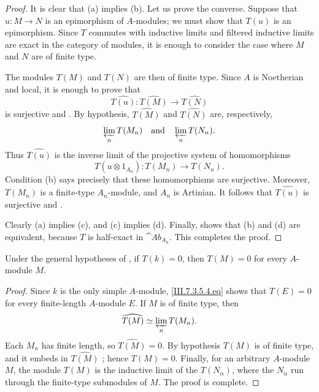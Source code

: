\begin{proof}
It is clear that (a) implies (b).  Let us prove the converse.
Suppose that $u:M\to N$ is an epimorphism of $A$-modules; we
must show that $T(u)$ is an epimorphism.  Since $T$ commutes
with inductive limits and filtered inductive limits are exact
in the category of modules, it is enough to consider the case
where $M$ and $N$ are of finite type.

The modules $T(M)$ and $T(N)$ are then of finite type.  Since
$A$ is Noetherian and local, it is enough to prove that
\[
  \widehat{T(u)}:
  \widehat{T(M)}
  \longrightarrow
  \widehat{T(N)}
\]
is surjective  and .
By hypothesis, $\widehat{T(M)}$ and $\widehat{T(N)}$ are,
respectively,
\[
  \varprojlim_n T(M_n)
  \quad\hbox{and}\quad
  \varprojlim_n T(N_n).
\]
Thus $\widehat{T(u)}$ is the inverse limit of the projective
system of homomorphisms
\[
  T(u\otimes 1_{A_n}):T(M_n)\longrightarrow T(N_n).
\]
Condition (b) says precisely that these homomorphisms are
surjective.  Moreover, $T(M_n)$ is a finite-type
$A_n$-module, and $A_n$ is Artinian.  It follows that
$\widehat{T(u)}$ is surjective  and
.

Clearly (a) implies (c), and (c) implies (d).  Finally,
 shows that (b) and (d) are equivalent,
because $T$ is half-exact in $\cat{Ab}_{A_n}$.  This completes
the proof.
\end{proof}

\begin{corollary}[7.5.3]
\label{III.7.5.3}
Under the general hypotheses of , if
$T(k)=0$, then $T(M)=0$ for every $A$-module $M$.
\end{corollary}

\begin{proof}
Since $k$ is the only simple $A$-module,
\eqref{III.7.3.5.4.eq} shows that $T(E)=0$ for every
finite-length $A$-module $E$.  If $M$ is of finite type, then
\[
  \widehat{T(M)}
  \simeq
  \varprojlim_n T(M_n).
\]
Each $M_n$ has finite length, so $\widehat{T(M)}=0$.  By
hypothesis $T(M)$ is of finite type, and it embeds in
$\widehat{T(M)}$ ; hence $T(M)=0$.
Finally, for an arbitrary $A$-module $M$, the module $T(M)$
is the inductive limit of the $T(N_\alpha)$, where the
$N_\alpha$ run through the finite-type submodules of $M$.
The proof is complete.
\end{proof}

